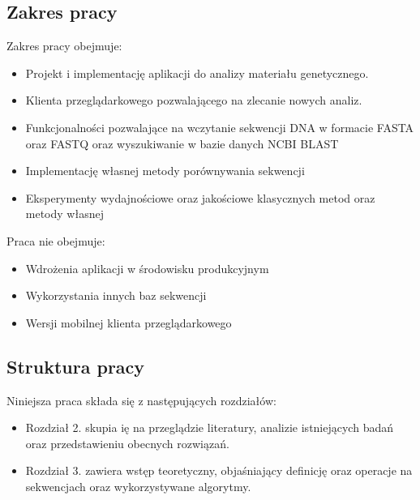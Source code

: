     \subsection {
        Zakres pracy
    }

        Zakres pracy obejmuje:
        \begin{itemize}
            \item Projekt i implementację aplikacji do analizy materiału genetycznego.
            \item Klienta przeglądarkowego pozwalającego na zlecanie nowych analiz.
            \item {
                Funkcjonalności pozwalające na wczytanie sekwencji DNA w formacie FASTA oraz FASTQ
                oraz wyszukiwanie w bazie danych NCBI BLAST
            }
            \item Implementację własnej metody porównywania sekwencji 
            \item Eksperymenty wydajnościowe oraz jakościowe klasycznych metod oraz metody własnej
        \end{itemize}

        Praca nie obejmuje:
        \begin{itemize}
            \item Wdrożenia aplikacji w środowisku produkcyjnym
            \item Wykorzystania innych baz sekwencji
            \item Wersji mobilnej klienta przeglądarkowego
        \end{itemize}

    \subsection {
        Struktura pracy
    }

        Niniejsza praca składa się z następujących rozdziałów:

        \begin{itemize}
            \item {
                Rozdział 2. skupia ię na przeglądzie literatury, analizie istniejących
                badań oraz przedstawieniu obecnych rozwiązań.
            }
            \item {
                Rozdział 3. zawiera wstęp teoretyczny, objaśniający definicję oraz 
                operacje na sekwencjach oraz wykorzystywane algorytmy.
            }
        \end{itemize}













